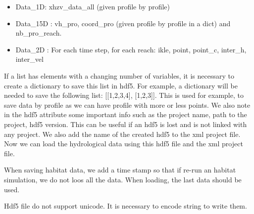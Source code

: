 \documentclass[letterpaper,10pt,english]{sphinxmanual}
\begin{document}
\begin{fulllineitems}
\begin{itemize}
\begin{itemize}
\item {} 
Data\_1D:  xhzv\_data\_all (given profile by profile)

\item {} 
Data\_15D :  vh\_pro, coord\_pro (given profile by profile in a dict) and nb\_pro\_reach.

\item {} 
Data\_2D : For each time step, for each reach: ikle, point, point\_c, inter\_h, inter\_vel

\end{itemize}

\end{itemize}

If a list has elements with a changing number of variables, it is necessary to create a dictionary to save
this list in hdf5. For example, a dictionary will be needed to save the following list: {[}{[}1,2,3,4{]}, {[}1,2,3{]}{]}.
This is used for example, to save data by profile as we can have profile with more or less points. We also note
in the hdf5 attribute some important info such as the project name, path to the project, hdf5 version.
This can be useful if an hdf5 is lost and is not linked with any project. We also add the name of the created
hdf5 to the xml project file. Now we can load the hydrological data using this hdf5 file and the xml project file.

When saving habitat data, we add a time stamp so that if re-run an habitat simulation, we do not loos all the data.
When loading, the last data should be used.

Hdf5 file do not support unicode. It is necessary to encode string to write them.

\end{fulllineitems}

\end{document}
